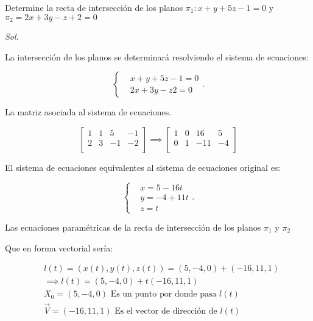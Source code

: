 \begin{example}
	Determine la recta de intersección de los planos
	$\pi_1:x+y+5z-1=0$ y $\pi_2=2x+3y-z+2=0$
\end{example}

\textit{ Sol. }

La intersección de los planos se determinará resolviendo el sistema de ecuaciones:

\begin{equation*}
	\begin{cases}
		 & x+y+5z-1=0 \\
		 & 2x+3y-z2=0
	\end{cases}.
\end{equation*}

La matriz asociada al sistema de ecuaciones.

\begin{equation*}
	\begin{bmatrix}
		1 & 1 & 5  & -1 \\
		2 & 3 & -1 & -2 \\
	\end{bmatrix}\implies  \begin{bmatrix}
		1 & 0 & 16  & 5  \\
		0 & 1 & -11 & -4 \\
	\end{bmatrix}
\end{equation*}

El sistema de ecuaciones equivalentes al sistema de ecuaciones original es:

\begin{equation*}
	\begin{cases}
		 & x=5-16t  \\
		 & y=-4+11t \\
		 & z=t
	\end{cases}.
\end{equation*}

Las ecuaciones paramétricas de la recta de intersección de los planos $\pi_1$ y $\pi_2$

Que en forma vectorial sería:

\begin{align*}
	 & l(t)=\left(x(t),y(t),z(t)\right)=(5,-4,0)+(-16,11,1)                     \\
	 & \implies l(t)=(5,-4,0)+t(-16,11,1)                                       \\
	 & X_0=(5,-4,0)\text{ Es un punto por donde pasa } l(t)                     \\
	 & \overrightarrow{V}=(-16,11,1) \text{ Es el vector de dirección de } l(t)
\end{align*}

